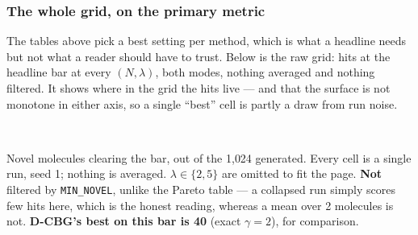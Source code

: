 \documentclass[11pt]{article}
\begin{document}
\subsubsection{The whole grid, on the primary metric}

The tables above pick a best setting per method, which is what a headline needs
but not what a reader should have to trust. Below is the raw grid: hits at the
headline bar at every $(N, \lambda)$, both modes, nothing averaged and nothing
filtered. It shows where in the grid the hits live --- and that the surface is
not monotone in either axis, so a single ``best'' cell is partly a draw from run
noise.

\begin{table}[htbp]
\centering
\scriptsize
\setlength{\tabcolsep}{3.5pt}
\\[0.4em] \begin{minipage}{0.92\textwidth}\footnotesize Novel molecules clearing the bar, out of the 1{,}024 generated. Every cell is a single run, seed 1; nothing is averaged. $\lambda \in \{2, 5\}$ are omitted to fit the page. \textbf{Not} filtered by \texttt{MIN\_NOVEL}, unlike the Pareto table --- a collapsed run simply scores few hits here, which is the honest reading, whereas a mean over 2 molecules is not. \textbf{D-CBG's best on this bar is 40} (exact $\gamma=2$), for comparison.\end{minipage}
\caption{MDLM: hits at QED $\geq 0.6$ across the whole $(N, \lambda)$ grid. Columns are (mixture mode) $\times$ $\lambda$.}
\label{tab:hits-grid-qed-MDLM}
\end{table}
\end{document}
